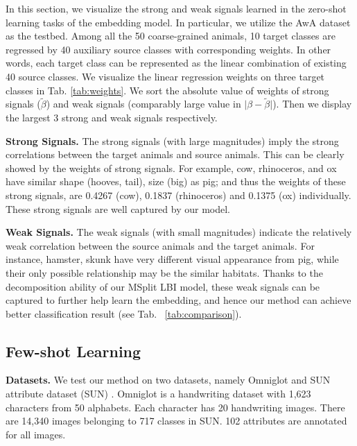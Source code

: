 \documentclass{article}
\begin{document}
\label{sec:exp-vis}In this section, we visualize the strong and weak
signals learned in the zero-shot learning tasks of the embedding model.
In particular, we utilize the AwA dataset as the testbed. Among all
the 50 coarse-grained animals, 10 target classes are regressed by
40 auxiliary source classes with corresponding weights. In other
words, each target class can be represented as the linear combination
of existing 40 source classes. We visualize the linear regression
weights on three target classes in Tab. \ref{tab:weights}.  {
We sort the absolute value of weights of strong signals ($\tilde{\beta}$) 
and weak signals (comparably large value in $\vert \beta-\tilde{\beta} \vert$). Then we display the largest 3 strong and weak signals respectively.}




\noindent \textbf{Strong Signals.} The strong signals  {(with large magnitudes)} imply the strong
correlations between the target animals and source animals. This can
be clearly showed by the weights of strong signals. For example, \textquotedbl{}cow\textquotedbl{},
\textquotedbl{}rhinoceros\textquotedbl{}, and \textquotedbl{}ox\textquotedbl{}
have similar shape (hooves, tail), size (big) as \textquotedbl{}pig\textquotedbl{};
and thus the weights of these strong signals, are 0.4267 (cow), 0.1837
(rhinoceros) and 0.1375 (ox) individually. These strong signals are
well captured by our model.




\noindent \textbf{Weak Signals.} The weak signals  {(with small magnitudes)} indicate the
relatively  {weak} correlation between the source animals and the target
animals. For instance, \textquotedbl{}hamster\textquotedbl{}, \textquotedbl{}skunk\textquotedbl{}
have very different visual appearance from \textquotedbl{}pig\textquotedbl{},
while their only possible relationship may be the similar habitats.
Thanks to the decomposition ability of our {MSplit} LBI model,
 {these weak signals can be captured to further help learn the
embedding, and hence our method can achieve better classification result (see Tab. ~\ref{tab:comparison}).}


\subsection{Few-shot Learning}


\noindent \textbf{Datasets.} We test our method on two datasets, namely Omniglot
\citet{lake2011one} and SUN attribute dataset (SUN) \cite{forinaextendible}. Omniglot is a handwriting dataset with 1,623
characters from 50 alphabets. Each character has 20 handwriting images. There are 14,340 images belonging to 717 classes in SUN. 102 attributes are
annotated for all images.
\end{document}
